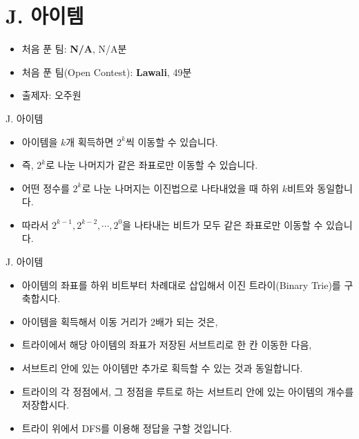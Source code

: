 \def\probno{J}
\def\probtitle{아이템}

\section{\probno{}. \probtitle{}}

\begin{frame} %
    \sectiontitle{\probno{}}{\probtitle{}}
    \begin{itemize}
        \item 처음 푼 팀: \textbf{N/A}, N/A분
        \item 처음 푼 팀(Open Contest): \textbf{Lawali}, 49분
        \item 출제자: 오주원
    \end{itemize}
\end{frame}

\begin{frame}{\probno{}. \probtitle{}}
    \begin{itemize}
        \item 아이템을 $k$개 획득하면 $2^k$씩 이동할 수 있습니다.
        \item 즉, $2^k$로 나눈 나머지가 같은 좌표로만 이동할 수 있습니다.
        \item 어떤 정수를 $2^k$로 나눈 나머지는 이진법으로 나타내었을 때 하위 $k$비트와 동일합니다.
        \item 따라서 $2^{k-1}, 2^{k-2}, \cdots, 2^0$을 나타내는 비트가 모두 같은 좌표로만 이동할 수 있습니다.
    \end{itemize}
\end{frame}

\begin{frame}{\probno{}. \probtitle{}}
    \begin{itemize}
        \item 아이템의 좌표를 하위 비트부터 차례대로 삽입해서 이진 트라이(Binary Trie)를 구축합시다.
        \item 아이템을 획득해서 이동 거리가 2배가 되는 것은,
        \item 트라이에서 해당 아이템의 좌표가 저장된 서브트리로 한 칸 이동한 다음,
        \item 서브트리 안에 있는 아이템만 추가로 획득할 수 있는 것과 동일합니다.
        \vspace{3mm}
        \item 트라이의 각 정점에서, 그 정점을 루트로 하는 서브트리 안에 있는 아이템의 개수를 저장합시다.
        \item 트라이 위에서 DFS를 이용해 정답을 구할 것입니다.
    \end{itemize}
\end{frame}

